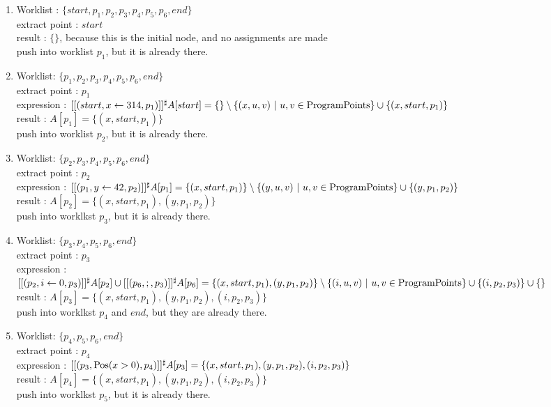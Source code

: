 \documentclass[a4paper]{article}
\begin{document}
\begin{enumerate}
  \item Worklist : $ \{ start, p_1, p_2, p_3, p_4, p_5, p_6, end \}  $ \\
  extract point : $ start $ \\
  result : $ \{\} $, because this is the initial node, and no assignments are made \\
  push into worklist $ p_1 $, but it is already there.
  
  \item Worklist: $ \{ p_1, p_2, p_3, p_4, p_5, p_6, end \} $ \\
  extract point : $ p_1 $ \\
  expression : $ [[(start, x \leftarrow 314, p_1)]]^\sharp A[start] = \{\} \setminus \{ (x, u, v)\ |\ u, v \in \mathrm{ProgramPoints} \} \cup \{ (x, start, p_1) \} $ \\
  result : $ A[p_1] = \{ (x, start, p_1) \} $ \\
  push into worklist $ p_2 $, but it is already there. 

  \item Worklist: $ \{ p_2, p_3, p_4, p_5, p_6, end \} $ \\
  extract point : $ p_2 $ \\
  expression : $ [[(p_1, y \leftarrow 42, p_2)]]^\sharp A[p_1] = \{ (x, start, p_1) \} \setminus \{ (y, u, v)\ |\ u, v \in \mathrm{ProgramPoints} \} \cup \{ (y, p_1, p_2) \} $ \\
  result : $ A[p_2] = \{ (x, start, p_1), (y, p_1, p_2) \} $ \\
  push into worklkst $ p_3 $, but it is already there. 

  \item Worklist: $ \{ p_3, p_4, p_5, p_6, end \} $ \\
  extract point : $ p_3 $ \\
  expression : $ [[(p_2, i \leftarrow 0, p_3)]]^\sharp A[p_2] \cup [[(p_6, ;, p_3)]]^\sharp A[p_6] = \{ (x, start, p_1), (y, p_1, p_2) \} \setminus \{ (i, u, v)\ |\ u, v \in \mathrm{ProgramPoints} \} \cup \{ (i, p_2, p_3) \} \cup \{\} $ \\
  result : $ A[p_3] = \{ (x, start, p_1), (y, p_1, p_2), (i, p_2, p_3) \} $ \\
  push into worklkst $ p_4 $ and $ end $, but they are already there.

  \item Worklist: $ \{ p_4, p_5, p_6, end \} $ \\
  extract point : $ p_4 $ \\
  expression : $ [[(p_3, \mathrm{Pos}(x > 0), p_4)]]^\sharp A[p_3] = \{ (x, start, p_1), (y, p_1, p_2), (i, p_2, p_3) \} $ \\
  result : $ A[p_4] = \{ (x, start, p_1), (y, p_1, p_2), (i, p_2, p_3) \} $ \\
  push into worklkst $ p_5 $, but it is already there. 


\end{enumerate}
\end{document}
